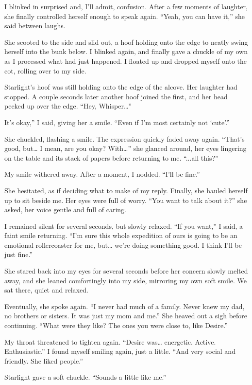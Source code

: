I blinked in surprised and, I’ll admit, confusion. After a few moments of laughter, she finally controlled herself enough to speak again. “Yeah, you can have it,” she said between laughs.

She scooted to the side and slid out, a hoof holding onto the edge to neatly swing herself into the bunk below. I blinked again, and finally gave a chuckle of my own as I processed what had just happened. I floated up and dropped myself onto the cot, rolling over to my side.

Starlight’s hoof was still holding onto the edge of the alcove. Her laughter had stopped. A couple seconds later another hoof joined the first, and her head peeked up over the edge. “Hey, Whisper…”

\leavevmode{}It’s okay,” I said, giving her a smile. “Even if I’m most certainly not ‘cute’.”

She chuckled, flashing a smile. The expression quickly faded away again. “That’s good, but… I mean, are you okay? With…” she glanced around, her eyes lingering on the table and its stack of papers before returning to me. “...all this?”

My smile withered away. After a moment, I nodded. “I’ll be fine.”

She hesitated, as if deciding what to make of my reply. Finally, she hauled herself up to sit beside me. Her eyes were full of worry. “You want to talk about it?” she asked, her voice gentle and full of caring.

I remained silent for several seconds, but slowly relaxed. “If you want,” I said, a faint smile returning. “I’m sure this whole expedition of ours is going to be an emotional rollercoaster for me, but… we’re doing something good. I think I’ll be just fine.”

She stared back into my eyes for several seconds before her concern slowly melted away, and she leaned comfortingly into my side, mirroring my own soft smile. We sat there, quiet and relaxed.

Eventually, she spoke again. “I never had much of a family. Never knew my dad, no brothers or sisters. It was just my mom and me.” She heaved out a sigh before continuing. “What were they like? The ones you were close to, like Desire.”

My throat threatened to tighten again. “Desire was… energetic. Active. Enthusiastic.” I found myself smiling again, just a little. “And very social and friendly. She liked people.”

Starlight gave a soft chuckle. “Sounds a little like me.”

